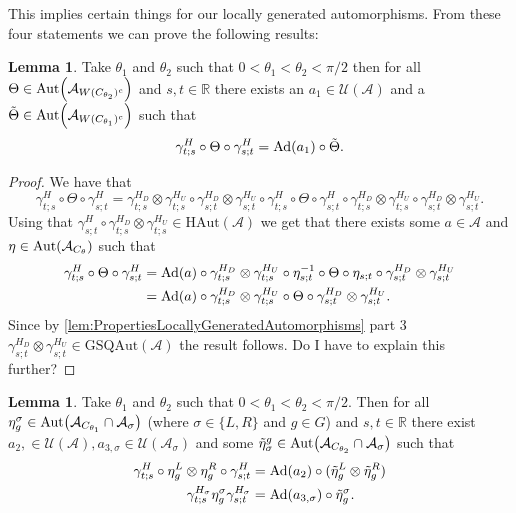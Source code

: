 \documentclass[12pt,a4paper,twoside]{article}
\let\originalleft\left
\let\originalright\right
\renewcommand{\left}{\mathopen{}\mathclose\bgroup\originalleft}
\renewcommand{\right}{\aftergroup\egroup\originalright}
\newcommand{\UU}{\mathcal U}
\renewcommand{\AA}{\mathcal A}
\newcommand{\RR}{\mathbb R}
\newcommand{\Ad}[1]{\textrm{Ad}\left(#1\right)}
\newcommand{\Aut}[1]{\textrm{Aut}\left(#1\right)}
\theoremstyle{definition}
\newtheorem{lemma}[theorem]{Lemma}
\numberwithin{equation}{section}
\begin{document}
This implies certain things for our locally generated automorphisms.
From these four statements we can prove the following results:
\begin{lemma}\label{lem:TwoAngleLemmaPart1}
	Take $\theta_1$ and $\theta_2$ such that $0<\theta_1<\theta_2<\pi/2$ then for all $\Theta\in\Aut{\AA_{W(C_{\theta_2})^c}}$ and $s,t\in\RR$ there exists an $a_1\in\UU(\AA)$ and a $\tilde{\Theta}\in \Aut{\AA_{W(C_{\theta_1})^c}}$ such that
		\begin{equation}\label{eq:TwoAngleLemmaPart1Equation1}
			\gamma^{H}_{t;s}\circ\Theta\circ\gamma^{H}_{s;t}=\Ad{a_1}\circ\tilde{\Theta}.
		\end{equation}
\end{lemma}
\begin{proof}
	We have that
	\begin{equation}
		\gamma^{H}_{t;s}\circ\Theta\circ\gamma^{H}_{s;t}=\gamma^{H_D}_{t;s}\otimes\gamma^{H_U}_{t;s}\circ\gamma^{H_D}_{s;t}\otimes\gamma^{H_U}_{s;t}\circ\gamma^{H}_{t;s}\circ\Theta\circ\gamma^{H}_{s;t}\circ\gamma^{H_D}_{t;s}\otimes\gamma^{H_U}_{t;s}\circ\gamma^{H_D}_{s;t}\otimes\gamma^{H_U}_{s;t}.
	\end{equation}
	Using that $\gamma^{H}_{s;t}\circ\gamma^{H_D}_{t;s}\otimes\gamma^{H_U}_{t;s}\in\textrm{HAut}(\AA)$ we get that there exists some $a\in\AA$ and $\eta\in\Aut{\AA_{C_\theta}}$ such that
	\begin{align}
		\gamma^{H}_{t;s}\circ\Theta\circ\gamma^{H}_{s;t}&=\Ad{a}\circ \gamma^{H_D}_{t;s}\otimes\gamma^{H_U}_{t;s}\circ\eta_{s;t}^{-1}\circ\Theta\circ\eta_{s;t}\circ\gamma^{H_D}_{s;t}\otimes\gamma^{H_U}_{s;t}\\
		&=\Ad{a}\circ \gamma^{H_D}_{t;s}\otimes\gamma^{H_U}_{t;s}\circ\Theta\circ\gamma^{H_D}_{s;t}\otimes\gamma^{H_U}_{s;t}.
	\end{align}
	Since by \ref{lem:PropertiesLocallyGeneratedAutomorphisms} part 3 $\gamma^{H_D}_{s;t}\otimes\gamma^{H_U}_{s;t}\in\textrm{GSQAut}(\AA)$ the result follows. {\color{red}Do I have to explain this further?}
\end{proof}
\begin{lemma}\label{lem:TwoAngleLemmaPart2}
	Take $\theta_1$ and $\theta_2$ such that $0<\theta_1<\theta_2<\pi/2$. Then for all $\eta_{g}^{\sigma}\in\Aut{\AA_{C_{\theta_1}}\cap\AA_{\sigma}}$ (where $\sigma\in\{L,R\}$ and $g\in G$) and $s,t\in\RR$ there exist $a_{2},\in\UU(\AA),a_{3,\sigma}\in\UU(\AA_\sigma)$ and some $\tilde{\eta}_{\sigma}^g\in \Aut{\AA_{C_{\theta_2}}\cap\AA_{\sigma}}$ such that
	\begin{align}
		\label{eq:TwoAngleLemmaPart2Equation1}
		\gamma^{H}_{t;s}\circ\eta_{g}^L\otimes\eta_{g}^R\circ\gamma^{H}_{s;t}&=\Ad{a_2}\circ(\tilde\eta_{g}^L \otimes\tilde\eta_{g}^R)\\
		\label{eq:TwoAngleLemmaPart2Equation2}
		\gamma^{H_\sigma}_{t;s}\eta_g^\sigma\gamma^{H_\sigma}_{s;t}&=\Ad{a_{3,\sigma}}\circ \tilde\eta_{g}^\sigma.
	\end{align}
\end{lemma}
\end{document}
